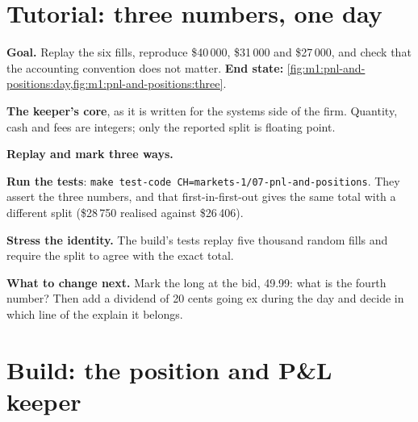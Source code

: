 \section{Tutorial: three numbers, one day}\label{tut:m1:pnl-and-positions:three}

\begin{tutorial}
\textbf{Goal.} Replay the six fills, reproduce \$40\,000, \$31\,000 and
\$27\,000, and check that the accounting convention does not matter.
\textbf{End state:} \cref{fig:m1:pnl-and-positions:day,fig:m1:pnl-and-positions:three}.
\begin{tutsteps}
\item \textbf{The keeper's core}, as it is written for the systems side of
the firm. Quantity, cash and fees are integers; only the reported split is
floating point.
\label{lst:m1:pnl-and-positions:cpp}
\item \textbf{Replay and mark three ways.}
\label{lst:m1:pnl-and-positions:three}
\item \textbf{Run the tests}: \texttt{make test-code CH=markets-1/07-pnl-and-positions}.
They assert the three numbers, and that first-in-first-out gives the same
total with a different split (\$28\,750 realised against \$26\,406).
\item \textbf{Stress the identity.} The build's tests replay five thousand
random fills and require the split to agree with the exact total.
\end{tutsteps}
\textbf{What to change next.} Mark the long at the bid, 49.99: what is the
fourth number? Then add a dividend of 20 cents going ex during the day and
decide in which line of the explain it belongs.
\end{tutorial}

\section{Build: the position and P\&L keeper}\label{bld:m1:pnl-and-positions:keeper}

